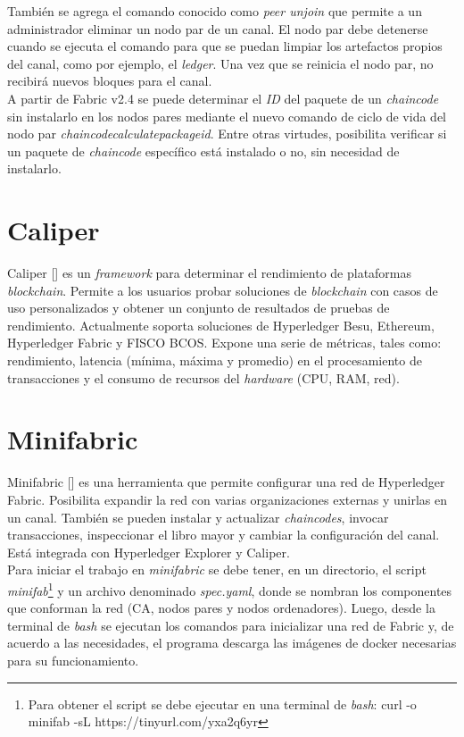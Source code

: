 {Tambi\'en se agrega el comando conocido como \emph{peer unjoin} que permite a un administrador eliminar un nodo par de un canal. El nodo par debe detenerse cuando se ejecuta el comando para que se puedan limpiar los artefactos propios del canal, como por ejemplo, el \emph{ledger}. Una vez que se reinicia el nodo par, no recibirá nuevos bloques para el canal.\\

A partir de Fabric v2.4 se puede determinar el \emph{ID} del paquete de un \emph{chaincode} sin instalarlo en los nodos pares mediante el nuevo comando de ciclo de vida del nodo par \emph{chaincodecalculatepackageid}. Entre otras virtudes, posibilita verificar si un paquete de \emph{chaincode} espec\'ifico est\'a instalado o no, sin necesidad de instalarlo.

\section{Caliper}
Caliper [\cite{Caliper}] es un \emph{framework} para determinar el rendimiento de plataformas \emph{blockchain}. Permite a los usuarios probar soluciones de \emph{blockchain} con casos de uso personalizados y obtener un conjunto de resultados de pruebas de rendimiento. Actualmente soporta soluciones de Hyperledger Besu, Ethereum, Hyperledger Fabric y FISCO BCOS. Expone una serie de m\'etricas, tales como: rendimiento, latencia (m\'inima, m\'axima y promedio) en el procesamiento de transacciones y el consumo de recursos del \emph{hardware} (CPU, RAM, red).  

\section{Minifabric}
Minifabric [\cite{minifabric}] es una herramienta que permite configurar una red de Hyperledger Fabric. Posibilita expandir la red con varias organizaciones externas y unirlas en un canal. Tambi\'en se pueden instalar y actualizar \emph{chaincodes}, invocar transacciones, inspeccionar el libro mayor y cambiar la configuraci\'on del canal. Est\'a integrada con Hyperledger Explorer y Caliper.\\

Para iniciar el trabajo en \emph{minifabric} se debe tener, en un directorio, el script \emph{minifab}\footnote{Para obtener el script se debe ejecutar en una terminal de \emph{bash}: curl -o minifab -sL https://tinyurl.com/yxa2q6yr} y un archivo denominado \emph{spec.yaml}, donde se nombran los componentes que conforman la red (CA, nodos pares y nodos ordenadores). Luego, desde la terminal de \emph{bash} se ejecutan los comandos para inicializar una red de Fabric y, de acuerdo a las necesidades, el programa descarga las im\'agenes de docker necesarias para su funcionamiento.\\

}
